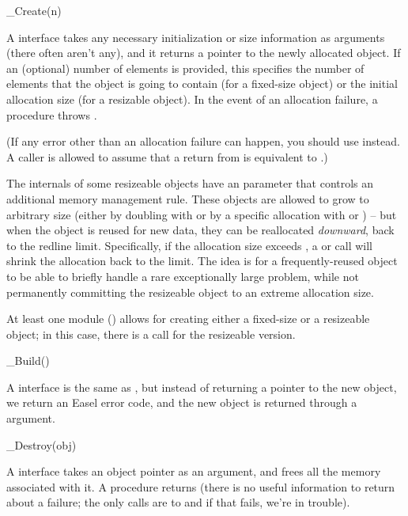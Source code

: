 \begin{sreapi}


\hypertarget{ifc:Create} 
{\item[\_Create(n)]}

A  interface takes any necessary initialization or
size information as arguments (there often aren't any), and it returns a
pointer to the newly allocated object. If an (optional) number of
elements  is provided, this specifies the number of elements
that the object is going to contain (for a fixed-size object) or the
initial allocation size (for a resizable object). In the event of an
allocation failure, a  procedure throws .

(If any error other than an allocation failure can happen, you should
use  instead. A caller is allowed to assume that a
 return from  is equivalent to
.)

The internals of some resizeable objects have an 
parameter that controls an additional memory management rule. These
objects are allowed to grow to arbitrary size (either by doubling with
 or by a specific allocation with  or
) -- but when the object is reused for new data, they
can be reallocated \emph{downward}, back to the redline
limit. Specifically, if the allocation size exceeds ,
a  or  call will shrink the
allocation back to the  limit.  The idea is for a
frequently-reused object to be able to briefly handle a rare
exceptionally large problem, while not permanently committing the
resizeable object to an extreme allocation size.

At least one module () allows for creating either a
fixed-size or a resizeable object; in this case, there is a
 call for the resizeable version.




\hypertarget{ifc:Build} 
{\item[\_Build()]}

A  interface is the same as , but
instead of returning a pointer to the new object, we return an Easel
error code, and the new object is returned through a 
argument.





\hypertarget{ifc:Destroy} 
{\item[\_Destroy(obj)]}
A  interface takes an object pointer as an
argument, and frees all the memory associated with it. A
 procedure returns  (there is no useful
information to return about a failure; the only calls are to 
 and if that fails, we're in trouble).
\end{sreapi}


